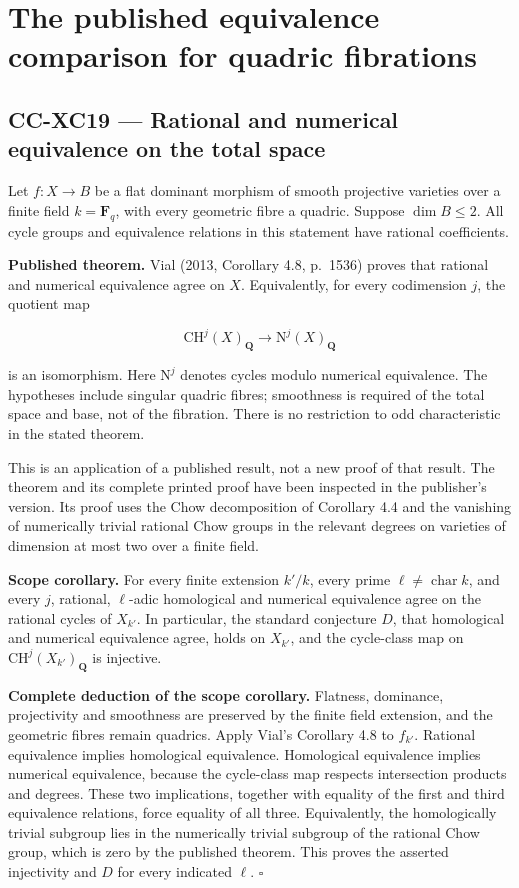 \section{The published equivalence comparison for quadric
fibrations}\label{the-published-equivalence-comparison-for-quadric-fibrations}

\subsection{CC-XC19 --- Rational and numerical equivalence on the total
space}\label{cc-xc19-rational-and-numerical-equivalence-on-the-total-space}

Let \(f:X\to B\) be a flat dominant morphism of smooth projective
varieties over a finite field \(k=\mathbf F_q\), with every geometric
fibre a quadric. Suppose \(\dim B\le2\). All cycle groups and
equivalence relations in this statement have rational coefficients.

\textbf{Published theorem.} Vial (2013, Corollary 4.8, p.~1536) proves
that rational and numerical equivalence agree on \(X\). Equivalently,
for every codimension \(j\), the quotient map

\[
  \mathrm{CH}^{j}(X)_{\mathbf Q}
       \longrightarrow
  \mathrm N^{j}(X)_{\mathbf Q}
\tag{CC-XC.Q5}
\]

is an isomorphism. Here \(\mathrm N^j\) denotes cycles modulo numerical
equivalence. The hypotheses include singular quadric fibres; smoothness
is required of the total space and base, not of the fibration. There is
no restriction to odd characteristic in the stated theorem.

This is an application of a published result, not a new proof of that
result. The theorem and its complete printed proof have been inspected
in the publisher's version. Its proof uses the Chow decomposition of
Corollary 4.4 and the vanishing of numerically trivial rational Chow
groups in the relevant degrees on varieties of dimension at most two
over a finite field.

\textbf{Scope corollary.} For every finite extension \(k'/k\), every
prime \(\ell\ne\operatorname{char}k\), and every \(j\), rational,
\(\ell\)-adic homological and numerical equivalence agree on the
rational cycles of \(X_{k'}\). In particular, the standard conjecture
\(D\), that homological and numerical equivalence agree, holds on
\(X_{k'}\), and the cycle-class map on
\(\mathrm{CH}^{j}(X_{k'})_{\mathbf Q}\) is injective.

\textbf{Complete deduction of the scope corollary.} Flatness, dominance,
projectivity and smoothness are preserved by the finite field extension,
and the geometric fibres remain quadrics. Apply Vial's Corollary 4.8 to
\(f_{k'}\). Rational equivalence implies homological equivalence.
Homological equivalence implies numerical equivalence, because the
cycle-class map respects intersection products and degrees. These two
implications, together with equality of the first and third equivalence
relations, force equality of all three. Equivalently, the homologically
trivial subgroup lies in the numerically trivial subgroup of the
rational Chow group, which is zero by the published theorem. This proves
the asserted injectivity and \(D\) for every indicated \(\ell\).
\(\square\)

